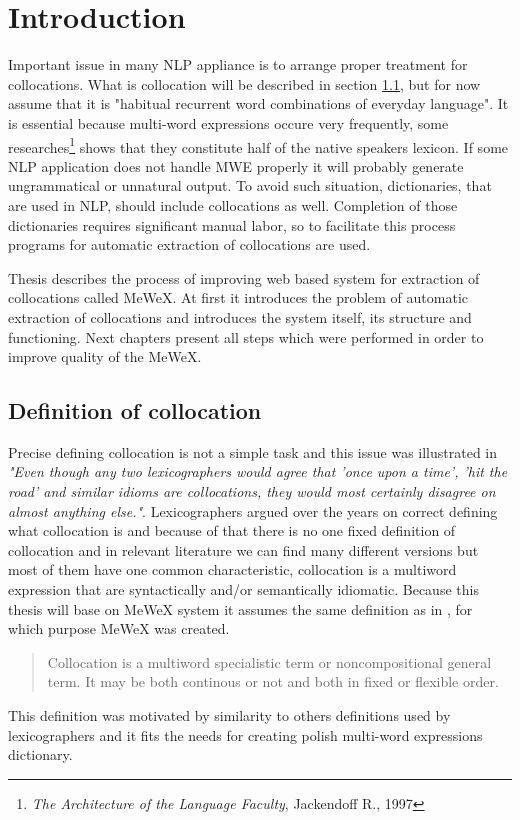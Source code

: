 
\chapter{Introduction}



Important issue in many NLP appliance is to arrange proper treatment for collocations. What is collocation will be described in 
section \ref{col_def}, but for now assume that it is "habitual recurrent word combinations of everyday language"\cite{ramisch}.
It is essential because multi-word expressions occure very frequently, some researches\footnote{
\textit{The Architecture of the Language Faculty}, Jackendoff R., 1997} shows that they constitute half of the native speakers lexicon.
If some NLP application does not handle MWE properly it will probably generate ungrammatical or unnatural output.
To avoid such situation, dictionaries, that are used in NLP, should include collocations as well. Completion of those dictionaries 
requires significant manual labor, so to facilitate this process programs for automatic extraction of collocations are used.

Thesis describes the process of improving web based system for extraction of collocations called MeWeX. 
At first it introduces the problem of automatic extraction of collocations and introduces the system itself, 
its structure and functioning. Next chapters present all steps which were performed in order to improve quality of the MeWeX.

\section{Definition of collocation}\label{col_def}
Precise defining collocation is not a simple task and this issue was illustrated in \cite{evert} 
\textit{"Even though any two lexicographers would agree that ’once upon a time’, ’hit the road’ and similar idioms are collocations,
they would most certainly disagree on almost anything else."}.
Lexicographers argued over the years on correct defining what collocation is and because of that there is no one fixed definition of collocation  
and in relevant literature we can find many different versions but most of them have one common characteristic, 
collocation is a multiword expression that are syntactically and/or semantically idiomatic. Because this thesis will base on MeWeX system 
it assumes the same definition as in \cite{mgr}, for which purpose MeWeX was created.
\begin{quote}
    Collocation is a multiword specialistic term or noncompositional general term. 
    It may be both continous or not and both in fixed or flexible order.
\end{quote}
This definition was motivated by similarity to others definitions used by lexicographers and it fits the needs for creating polish multi-word expressions dictionary. 

